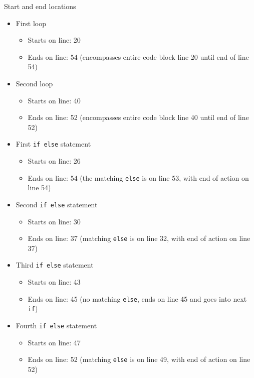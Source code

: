 \documentclass[
]{book}
\providecommand{\tightlist}{%
  \setlength{\itemsep}{0pt}\setlength{\parskip}{0pt}}
\begin{document}
Start and end locations

\begin{itemize}
\tightlist
\item
  First loop

  \begin{itemize}
  \tightlist
  \item
    Starts on line: 20
  \item
    Ends on line: 54 (encompasses entire code block line 20 until end of line 54)
  \end{itemize}
\item
  Second loop

  \begin{itemize}
  \tightlist
  \item
    Starts on line: 40
  \item
    Ends on line: 52 (encompasses entire code block line 40 until end of line 52)
  \end{itemize}
\item
  First \texttt{if\ else} statement

  \begin{itemize}
  \tightlist
  \item
    Starts on line: 26
  \item
    Ends on line: 54 (the matching \texttt{else} is on line 53, with end of action on line 54)
  \end{itemize}
\item
  Second \texttt{if\ else} statement

  \begin{itemize}
  \tightlist
  \item
    Starts on line: 30
  \item
    Ends on line: 37 (matching \texttt{else} is on line 32, with end of action on line 37)
  \end{itemize}
\item
  Third \texttt{if\ else} statement

  \begin{itemize}
  \tightlist
  \item
    Starts on line: 43
  \item
    Ends on line: 45 (no matching \texttt{else}, ends on line 45 and goes into next \texttt{if})
  \end{itemize}
\item
  Fourth \texttt{if\ else} statement

  \begin{itemize}
  \tightlist
  \item
    Starts on line: 47
  \item
    Ends on line: 52 (matching \texttt{else} is on line 49, with end of action on line 52)
  \end{itemize}
\end{itemize}
\end{document}
